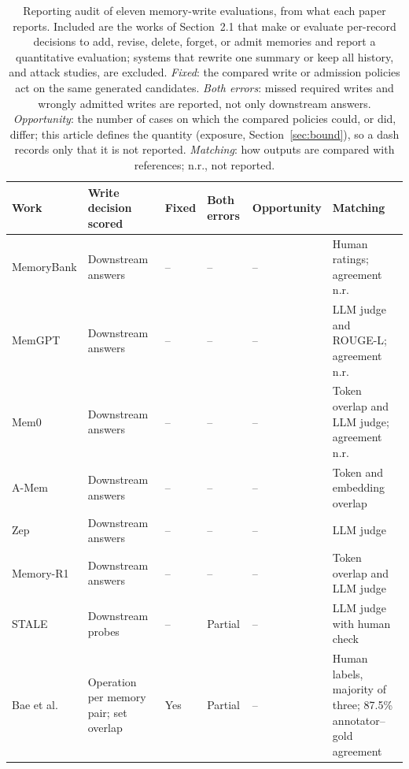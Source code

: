 \documentclass[acmsmall,review]{acmart}
\begin{document}
\begin{table}[tbp]
\centering
\caption{Reporting audit of eleven memory-write evaluations, from what each paper reports. Included are the works of Section~2.1 that make or evaluate per-record decisions to add, revise, delete, forget, or admit memories and report a quantitative evaluation; systems that rewrite one summary or keep all history, and attack studies, are excluded. \emph{Fixed}: the compared write or admission policies act on the same generated candidates. \emph{Both errors}: missed required writes and wrongly admitted writes are reported, not only downstream answers. \emph{Opportunity}: the number of cases on which the compared policies could, or did, differ; this article defines the quantity (exposure, Section~\ref{sec:bound}), so a dash records only that it is not reported. \emph{Matching}: how outputs are compared with references; n.r., not reported.}\label{tab:1}
\footnotesize
\setlength{\tabcolsep}{3pt}
\begin{tabular}{@{}>{\raggedright\arraybackslash}p{}>{\raggedright\arraybackslash}p{}>{\raggedright\arraybackslash}p{}>{\raggedright\arraybackslash}p{}>{\raggedright\arraybackslash}p{}>{\raggedright\arraybackslash}p{}@{}}
\toprule
\textbf{Work} & \textbf{Write decision scored} & \textbf{Fixed} & \textbf{Both errors} & \textbf{Opportunity} & \textbf{Matching} \\
\midrule
MemoryBank \cite{cite47} & Downstream answers & -- & -- & -- & Human ratings; agreement n.r. \\
MemGPT \cite{cite21} & Downstream answers & -- & -- & -- & LLM judge and ROUGE-L; agreement n.r. \\
Mem0 \cite{cite6} & Downstream answers & -- & -- & -- & Token overlap and LLM judge; agreement n.r. \\
A-Mem \cite{cite39} & Downstream answers & -- & -- & -- & Token and embedding overlap \\
Zep \cite{cite26} & Downstream answers & -- & -- & -- & LLM judge \\
Memory-R1 \cite{cite40} & Downstream answers & -- & -- & -- & Token overlap and LLM judge \\
STALE \cite{cite50} & Downstream probes & -- & Partial & -- & LLM judge with human check \\
Bae et al. \cite{cite4} & Operation per memory pair; set overlap & Yes & Partial & -- & Human labels, majority of three; 87.5\% annotator--gold agreement \\

\end{tabular}
\end{table}
\end{document}
